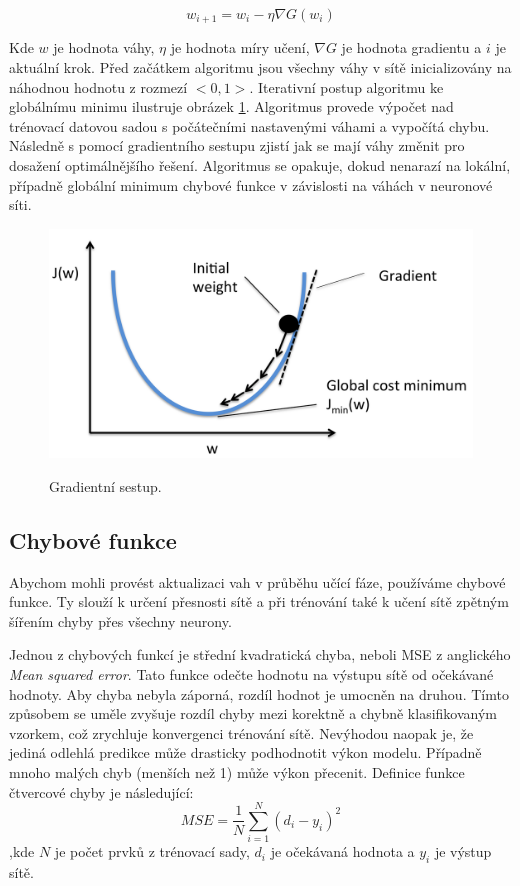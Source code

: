 \begin{equation}
    w_{i+1} = w_i - \eta \nabla G(w_i)
\end{equation}

Kde $w$ je hodnota váhy, $\eta$ je hodnota míry učení, 
$\nabla G$ je hodnota gradientu a $i$ je aktuální krok.
Před začátkem algoritmu jsou všechny váhy v sítě
inicializovány na náhodnou hodnotu z rozmezí $<0,1>$.
Iterativní postup algoritmu ke globálnímu minimu 
ilustruje obrázek \ref{obrazekGradientDescent}.
Algoritmus provede výpočet nad trénovací datovou sadou 
s počátečními nastavenými váhami
a vypočítá chybu.
Následně s pomocí gradientního sestupu zjistí
jak se mají váhy změnit pro dosažení optimálnějšího řešení.
Algoritmus se opakuje, dokud nenarazí na lokální,
případně globální minimum chybové funkce v závislosti na váhách v neuronové síti.
\cite{Raschka_GradientDescent, Goodfellow-et-al-2016}

\begin{figure}[h]\centering
    \centering
    \includegraphics[width=0.7\linewidth]{obrazky/GradientDescent.png}\\[1pt]  
    \caption{Gradientní sestup. \cite{Raschka_GradientDescent}}    
    \label{obrazekGradientDescent}
\end{figure}

\subsection{Chybové funkce}
Abychom mohli provést aktualizaci vah v průběhu učící fáze,
používáme chybové funkce.
Ty slouží k určení přesnosti sítě
a při trénování také k učení sítě zpětným šířením chyby přes všechny neurony.
\par
Jednou z chybových funkcí je střední kvadratická chyba,
neboli MSE z anglického \emph{Mean squared error}.
Tato funkce odečte hodnotu na výstupu sítě od očekávané hodnoty.
Aby chyba nebyla záporná, rozdíl hodnot je umocněn na druhou.
Tímto způsobem se uměle zvyšuje rozdíl chyby mezi korektně
a chybně klasifikovaným vzorkem,
což zrychluje konvergenci trénování sítě.
Nevýhodou naopak je, že jediná odlehlá predikce 
může drasticky podhodnotit výkon modelu.
Případně mnoho malých chyb (menších než 1) může výkon přecenit.
Definice funkce čtvercové chyby je následující:
\begin{equation}
    MSE = \frac{1}{N} \sum^{N}_{i=1}(d_i - y_i)^2 
\end{equation}
,kde $N$ je počet prvků z trénovací sady, $d_i$ je očekávaná hodnota a $y_i$ je výstup sítě.
\par

